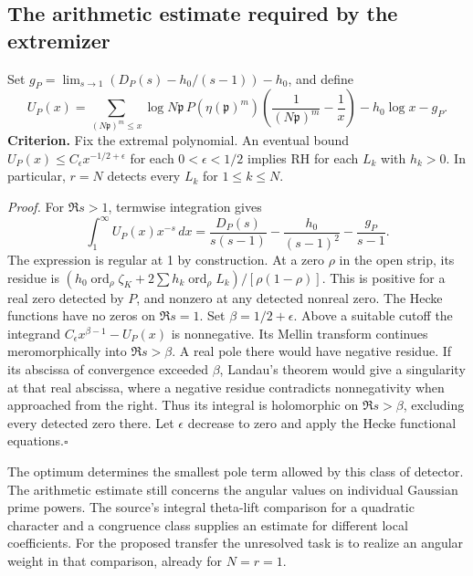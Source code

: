 \subsection{The arithmetic estimate required by the extremizer}
Set $g_P=\lim_{s\to1}(D_P(s)-h_0/(s-1))-h_0$, and define
\[
 U_P(x)=\sum_{(N\mathfrak p)^m\le x}\!
 \log N\mathfrak p\,P(\eta(\mathfrak p)^m)
 \left(\frac1{(N\mathfrak p)^m}-\frac1x\right)-h_0\log x-g_P.
\]
\noindent\textbf{Criterion.}
Fix the extremal polynomial. An eventual bound $U_P(x)\le C_\epsilon
x^{-1/2+\epsilon}$ for each $0<\epsilon<1/2$ implies RH for
each $L_k$ with $h_k>0$. In particular, $r=N$ detects every
$L_k$ for $1\le k\le N$.

\medskip\noindent\emph{Proof.}
For $\Re s>1$, termwise integration gives
\[
 \int_1^\infty U_P(x)x^{-s}\,dx=
 \frac{D_P(s)}{s(s-1)}-\frac{h_0}{(s-1)^2}-\frac{g_P}{s-1}.
\]
The expression is regular at 1 by construction. At a zero $\rho$
in the open strip, its residue is
$(h_0\operatorname{ord}_\rho\zeta_K+2\sum h_k\operatorname{ord}_\rho L_k)/
[\rho(1-\rho)]$. This is positive for a real zero detected by $P$, and
nonzero at any detected nonreal zero. The Hecke functions have no zeros on
$\Re s=1$.
Set $\beta=1/2+\epsilon$. Above a suitable cutoff the integrand
$C_\epsilon x^{\beta-1}-U_P(x)$ is nonnegative. Its Mellin transform
continues meromorphically into $\Re s>\beta$. A real pole there would
have negative residue. If its abscissa of convergence exceeded $\beta$,
Landau's theorem would give a singularity at that real abscissa, where
a negative residue contradicts nonnegativity when approached from the right.
Thus its integral is holomorphic on $\Re s>\beta$, excluding every detected zero there.
Let $\epsilon$ decrease to zero and apply the Hecke functional equations.\hfill$\square$

The optimum determines the smallest pole term allowed by this class of detector.
The arithmetic estimate still concerns the angular values on individual Gaussian
prime powers. The source's integral theta-lift comparison for a quadratic
character and a congruence class supplies an estimate for different local coefficients.
For the proposed transfer the unresolved task is to realize an angular weight
in that comparison, already for $N=r=1$.

